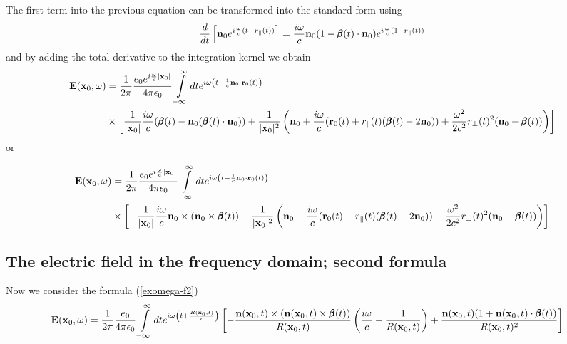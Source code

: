 The first term into the previous equation can be transformed into the standard form using
\begin{align}
    \frac{d}{dt}\left[{\bf n}_0 e^{i\frac{\omega}{c}(t-r_\parallel(t))}\right]=\frac{i\omega}c{\bf n}_0 (1-{\pmb \beta}(t)\cdot{\bf n}_0) e^{i\frac{\omega}{c}(1-r_\parallel(t))}\label{partsn0}
\end{align}
and by adding the total derivative to the integration kernel we obtain
\begin{align}
    {\bf E}({\bf x}_0,\omega) & =\frac1{2\pi}\frac{e_0 e^{i\frac{\omega}{c}|{\bf x}_0|}}{4\pi\epsilon_0}\int\limits_{-\infty}^{\infty}dte^{i\omega\left( t-\frac1c{\bf n}_0\cdot{\bf r}_0(t)\right)}\nonumber                                                                                                                      \\
                              & \times\left[\frac1{|{\bf x}_0|}\frac{i\omega}c({\pmb \beta}(t)-{\bf n}_0 ({\pmb \beta}(t)\cdot{\bf n}_0))+\frac1{|{\bf x}_0|^2}\left({\bf n}_0+\frac{i\omega}c({\bf r}_0(t)+r_\parallel(t)({\pmb \beta}(t)-2{\bf n}_0))+\frac{\omega^2}{2c^2}r_\perp(t)^2({\bf n}_0-{\pmb \beta}(t))\right)\right]
\end{align}
or
\begin{tcolorbox}[colback=blue!5!white,colframe=blue!75!black]
    \begin{align}
        {\bf E}({\bf x}_0,\omega) & =\frac1{2\pi}\frac{e_0 e^{i\frac{\omega}{c}|{\bf x}_0|}}{4\pi\epsilon_0}\int\limits_{-\infty}^{\infty}dte^{i\omega\left( t-\frac1c{\bf n}_0\cdot{\bf r}_0(t)\right)}\nonumber                                                                                                           \\
                                  & \times\left[-\frac1{|{\bf x}_0|}\frac{i\omega}c{\bf n}_0\times({\bf n}_0\times{\pmb \beta}(t))+\frac1{|{\bf x}_0|^2}\left({\bf n}_0+\frac{i\omega}c({\bf r}_0(t)+r_\parallel(t)({\pmb \beta}(t)-2{\bf n}_0))+\frac{\omega^2}{2c^2}r_\perp(t)^2({\bf n}_0-{\pmb \beta}(t))\right)\right]
    \end{align}
\end{tcolorbox}


\subsection{The electric field in the frequency domain; second formula}

Now we consider the formula (\ref{exomega-f2})
\begin{align}
    {\bf E}({\bf x}_0,\omega) & =\frac1{2\pi}\frac{e_0}{4\pi\epsilon_0}\int\limits_{-\infty}^{\infty}dte^{i\omega\left( t+\frac{R({\bf x}_0,t)}{c}\right)}\left[-\frac{{\bf n}({\bf x}_0,t)\times({\bf n}({\bf x}_0,t)\times{\pmb \beta}(t))}{R({\bf x}_0,t)}\left(\frac{i\omega}c-\frac1{R({\bf x}_0,t)}\right)+\frac{{\bf n}({\bf x}_0,t)(1+{\bf n}({\bf x}_0,t)\cdot{\pmb \beta}(t))}{R({\bf x}_0,t)^2}\right]
\end{align}

